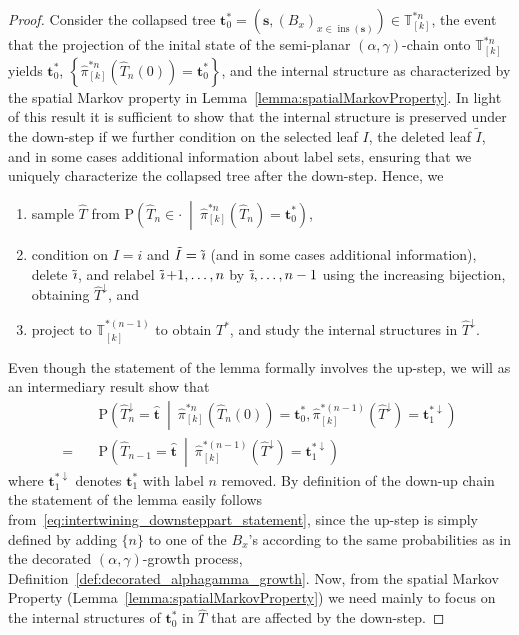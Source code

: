 \documentclass[a4paper, final]{amsart}
\theoremstyle{plain}
\theoremstyle{definition}
\newcommand{\tree}[1][t]{\boldsymbol{#1}}
\newcommand{\that}[1][t]{\hat{\boldsymbol{#1}}} %
\newcommand{\That}[1][T]{\widehat{#1}}
\newcommand{\T}{\mathbb{T}}
\DeclareMathOperator{\insertable}{ins}
\DeclareMathOperator{\tildei}{\tilde{\textit{\i}}}
\renewcommand{\P}{\mathrm{P}}
\begin{document}
\begin{proof}
%
  Consider the collapsed tree $\tree_0^* = \left( \tree[s], {\left( B_x \right)}_{x \in \insertable (\tree[s])} \right) \in \T_{[k]}^{*n}$, the event that the projection of the inital state of the semi-planar $(\alpha, \gamma)$-chain onto $\T_{[k]}^{* n}$ yields $\tree_0^*$, $\left\{\hat{\pi}_{[k]}^{* n} \left( \That_n(0) \right) = \tree_0^* \right\}$, and the internal structure as characterized by the spatial Markov property in Lemma~\ref{lemma:spatialMarkovProperty}.
  In light of this result it is sufficient to show that the internal structure is preserved under the down-step if we further condition on the selected leaf $I$, the deleted leaf $\tilde{I}$, and in some cases additional information about label sets, ensuring that we uniquely characterize the collapsed tree after the down-step.
  Hence, we 
  \begin{enumerate}
    \item sample $\That$ from $\P \left( \That_n \in \cdot \ \middle \vert \ \hat{\pi}_{[k]}^{* n} \left( \That_n \right) = \tree_0^* \right)$,
    \item condition on $I = i$ and $\tilde{I} = \tildei$ (and in some cases additional information), delete $\tildei$, and relabel $\tildei + 1, \ldots, n$ by $\tildei, \ldots, n-1$ using the increasing bijection, obtaining $\That^\downarrow$, and
    \item project to $\T_{[k]}^{*(n-1)}$ to obtain $T^*$, and study the internal structures in $\That^\downarrow$.
  \end{enumerate}
  Even though the statement of the lemma formally involves the up-step, we will as an intermediary result show that
  \begin{align}
    &\P \left( \That_n^\downarrow = \that \ \middle \vert \ \hat{\pi}_{[k]}^{* n} \left( \That_n(0) \right) = \tree_0^*, \hat{\pi}_{[k]}^{* (n-1)} \left( \That^\downarrow \right) = \tree_1^{*\downarrow} \right) \nonumber \\
    = \quad &\P \left( \That_{n-1} = \that \ \middle \vert \ \hat{\pi}_{[k]}^{* (n-1)} \left( \That^\downarrow \right) = \tree_1^{*\downarrow} \right)
    \label{eq:intertwining_downsteppart_statement}
  \end{align}
  where $\tree_1^{* \downarrow}$ denotes $\tree_1^*$ with label $n$ removed.
  By definition of the down-up chain the statement of the lemma easily follows from~\eqref{eq:intertwining_downsteppart_statement}, since the up-step is simply defined by adding $\{ n \}$ to one of the $B_x$'s according to the same probabilities as in the decorated $(\alpha, \gamma)$-growth process, Definition~\ref{def:decorated_alphagamma_growth}.
  Now, from the spatial Markov Property (Lemma~\ref{lemma:spatialMarkovProperty}) we need mainly to focus on the internal structures of $\tree_0^*$ in $\That$ that are affected by the down-step.
  

\end{proof}
\end{document}
